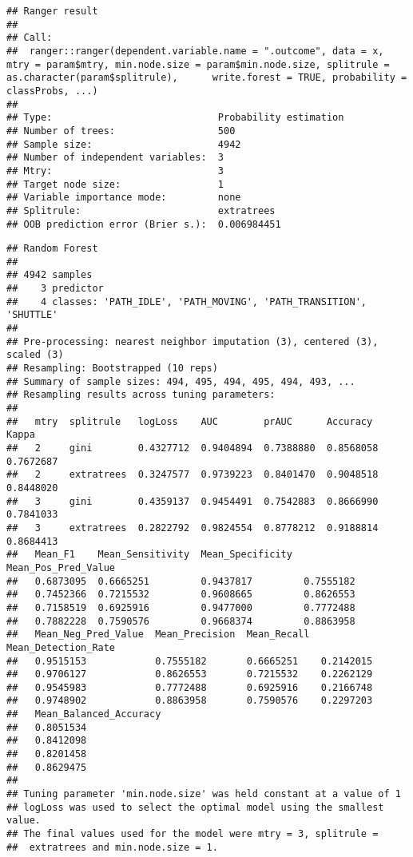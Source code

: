 \documentclass[]{article}
\begin{document}
\begin{verbatim}
## Ranger result
## 
## Call:
##  ranger::ranger(dependent.variable.name = ".outcome", data = x,      mtry = param$mtry, min.node.size = param$min.node.size, splitrule = as.character(param$splitrule),      write.forest = TRUE, probability = classProbs, ...) 
## 
## Type:                             Probability estimation 
## Number of trees:                  500 
## Sample size:                      4942 
## Number of independent variables:  3 
## Mtry:                             3 
## Target node size:                 1 
## Variable importance mode:         none 
## Splitrule:                        extratrees 
## OOB prediction error (Brier s.):  0.006984451
\end{verbatim}

\begin{verbatim}
## Random Forest 
## 
## 4942 samples
##    3 predictor
##    4 classes: 'PATH_IDLE', 'PATH_MOVING', 'PATH_TRANSITION', 'SHUTTLE' 
## 
## Pre-processing: nearest neighbor imputation (3), centered (3), scaled (3) 
## Resampling: Bootstrapped (10 reps) 
## Summary of sample sizes: 494, 495, 494, 495, 494, 493, ... 
## Resampling results across tuning parameters:
## 
##   mtry  splitrule   logLoss    AUC        prAUC      Accuracy   Kappa    
##   2     gini        0.4327712  0.9404894  0.7388880  0.8568058  0.7672687
##   2     extratrees  0.3247577  0.9739223  0.8401470  0.9048518  0.8448020
##   3     gini        0.4359137  0.9454491  0.7542883  0.8666990  0.7841033
##   3     extratrees  0.2822792  0.9824554  0.8778212  0.9188814  0.8684413
##   Mean_F1    Mean_Sensitivity  Mean_Specificity  Mean_Pos_Pred_Value
##   0.6873095  0.6665251         0.9437817         0.7555182          
##   0.7452366  0.7215532         0.9608665         0.8626553          
##   0.7158519  0.6925916         0.9477000         0.7772488          
##   0.7882228  0.7590576         0.9668374         0.8863958          
##   Mean_Neg_Pred_Value  Mean_Precision  Mean_Recall  Mean_Detection_Rate
##   0.9515153            0.7555182       0.6665251    0.2142015          
##   0.9706127            0.8626553       0.7215532    0.2262129          
##   0.9545983            0.7772488       0.6925916    0.2166748          
##   0.9748902            0.8863958       0.7590576    0.2297203          
##   Mean_Balanced_Accuracy
##   0.8051534             
##   0.8412098             
##   0.8201458             
##   0.8629475             
## 
## Tuning parameter 'min.node.size' was held constant at a value of 1
## logLoss was used to select the optimal model using the smallest value.
## The final values used for the model were mtry = 3, splitrule =
##  extratrees and min.node.size = 1.
\end{verbatim}
\end{document}
